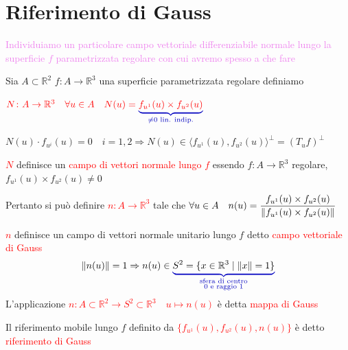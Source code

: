     \section{Riferimento di Gauss}
        \textcolor{violet}{Individuiamo un particolare campo vettoriale differenziabile normale lungo la superficie $f$ parametrizzata regolare
        con cui avremo spesso a che fare}
        \begin{definizione}
        Sia $A \subset \mathbb{R}^2$ $f \colon A \to \mathbb{R}^3$ una superficie parametrizzata regolare definiamo 

        $\textcolor{red}{N \colon A \to \mathbb{R}^3} \quad \textcolor{red}{\forall u \in A \quad N(u) = \textcolor{blu}{\underbrace{\textcolor{red}{f_{u^1}(u) \times f_{u^2}(u)}}_{\neq 0 \text{ lin. indip.}}}} $

        $N(u) \cdot f_{u^i}(u) = 0 \quad i=1,2 \Rightarrow N(u) \in \langle f_{u^1}(u), f_{u^2}(u) \rangle^\perp =\left( T_u f \right)^\perp$

        \textcolor{red}{$N$} definisce un \textcolor{red}{campo di vettori normale lungo $f$} essendo $f \colon A \to \mathbb{R}^3$ regolare, $f_{u^1}(u) \times f_{u^2}(u) \neq 0$ 

        Pertanto si può definire \textcolor{red}{$n \colon A \to \mathbb{R}^3$} tale che \textcolor{red}{$\forall u \in A \quad n(u)=\dfrac{f_{u^1}(u) \times f_{u^2}(u)}{\lVert f_{u^1}(u) \times f_{u^2}(u)\rVert}$}

        \textcolor{red}{$n$} definisce un campo di vettori normale unitario lungo $f$ detto \textcolor{red}{campo vettoriale di Gauss}
        \[ \norm{n(u)} = 1 \Rightarrow n(u) \in \textcolor{blu}{\underbrace{\textcolor{black}{S^2= \{ x \in \mathbb{R}^3 \mid \norm{x} = 1 \}}}_{\substack{\text{sfera di centro} \\ 0 \text{ e raggio } 1}}} \]
        L'applicazione \textcolor{red}{$n \colon A \subset \mathbb{R}^2 \to S^2 \subset \mathbb{R}^3 \quad u \mapsto n(u)$} è detta \textcolor{red}{mappa di Gauss}  

        Il riferimento mobile lungo $f$ definito da \textcolor{red}{$\{ f_{u^1}(u), f_{u^2}(u), n(u) \} $} è detto \textcolor{red}{riferimento di Gauss}
        \begin{center}
\end{center}
\end{definizione}
